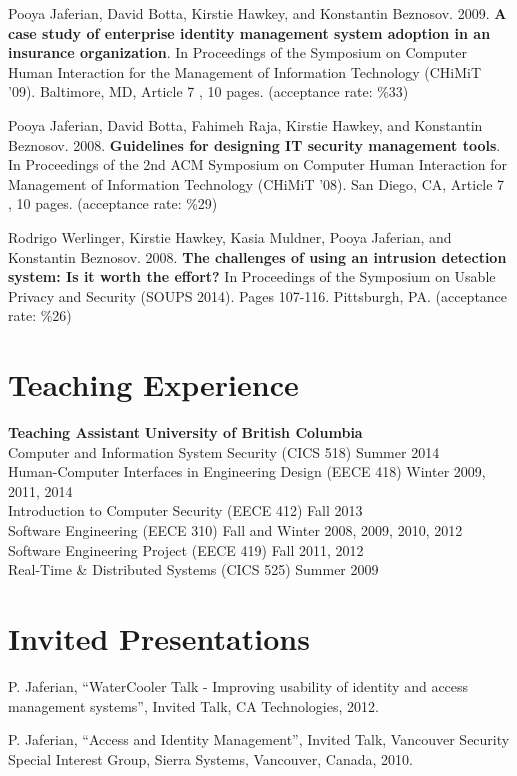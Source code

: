 \documentclass[margin]{res}
\begin{document}
\begin{resume}
Pooya Jaferian, David Botta, Kirstie Hawkey, and Konstantin Beznosov. 2009. \textbf{A case study of enterprise identity management system adoption in an insurance organization}. In Proceedings of the Symposium on Computer Human Interaction for the Management of Information Technology (CHiMiT '09). Baltimore, MD, Article 7 , 10 pages. (acceptance rate: \%33)

Pooya Jaferian, David Botta, Fahimeh Raja, Kirstie Hawkey, and Konstantin Beznosov. 2008. \textbf{Guidelines for designing IT security management tools}. In Proceedings of the 2nd ACM Symposium on Computer Human Interaction for Management of Information Technology (CHiMiT '08). San Diego, CA, Article 7 , 10 pages. (acceptance rate: \%29)

Rodrigo Werlinger, Kirstie Hawkey, Kasia Muldner, Pooya Jaferian, and Konstantin Beznosov. 2008. \textbf{The challenges of using an intrusion detection system: Is it worth the effort?} In Proceedings of the Symposium on Usable Privacy and Security (SOUPS 2014). Pages 107-116. Pittsburgh, PA. (acceptance rate: \%26)

\section{\sc Teaching Experience}
{\bf Teaching Assistant} {\hfill} {\bf University of British Columbia} \\
Computer and Information System Security (CICS 518){\hfill} {Summer 2014} \\
Human-Computer Interfaces in Engineering Design (EECE 418){\hfill} { Winter 2009, 2011, 2014}  \\
Introduction to Computer Security (EECE 412) {\hfill} {Fall 2013} \\
Software Engineering (EECE 310) {\hfill} { Fall and Winter 2008, 2009, 2010, 2012} \\
Software Engineering Project (EECE 419){\hfill}  {Fall 2011, 2012} \\
Real-Time \& Distributed Systems (CICS 525) {\hfill} {Summer 2009}


\section{\sc Invited Presentations}
P. Jaferian, ``WaterCooler Talk - Improving usability of identity and access management systems'', Invited Talk, CA Technologies, 2012.


P. Jaferian, ``Access and Identity Management'',  Invited Talk, Vancouver Security Special Interest Group, Sierra Systems, Vancouver, Canada, 2010.



\end{resume}
\end{document}
